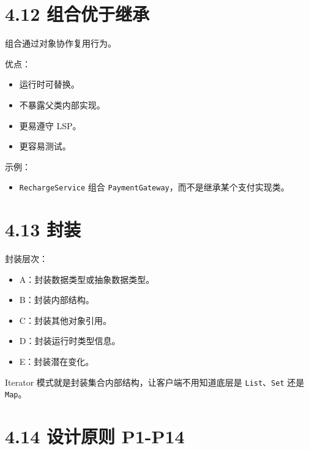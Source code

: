 \documentclass[UTF8,zihao=-4]{ctexart}
\begin{document}
\section{4.12 组合优于继承}

组合通过对象协作复用行为。

优点：

\begin{itemize}
\item 运行时可替换。
\item 不暴露父类内部实现。
\item 更易遵守 LSP。
\item 更容易测试。
\end{itemize}

示例：

\begin{itemize}
\item \texttt{RechargeService} 组合 \texttt{PaymentGateway}，而不是继承某个支付实现类。
\end{itemize}

\section{4.13 封装}

封装层次：

\begin{itemize}
\item A：封装数据类型或抽象数据类型。
\item B：封装内部结构。
\item C：封装其他对象引用。
\item D：封装运行时类型信息。
\item E：封装潜在变化。
\end{itemize}

Iterator 模式就是封装集合内部结构，让客户端不用知道底层是 \texttt{List}、\texttt{Set} 还是 \texttt{Map}。

\section{4.14 设计原则 P1-P14}
\end{document}
